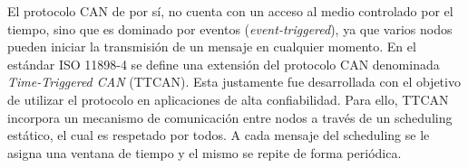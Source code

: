 
El protocolo CAN de por sí, no cuenta con un acceso al medio controlado por el tiempo, sino que es dominado por eventos (\textit{event-triggered}), ya que varios nodos pueden iniciar la transmisión de un mensaje en cualquier momento. En el estándar ISO 11898-4\cite{ISO11898_4} se define una extensión del protocolo CAN denominada \textit{Time-Triggered CAN} (TTCAN). Esta justamente fue desarrollada con el objetivo de utilizar el protocolo en aplicaciones de alta confiabilidad. Para ello, TTCAN incorpora un mecanismo de comunicación entre nodos a través de un scheduling estático, el cual es respetado por todos. A cada mensaje del scheduling se le asigna una ventana de tiempo y el mismo se repite de forma periódica.\\




